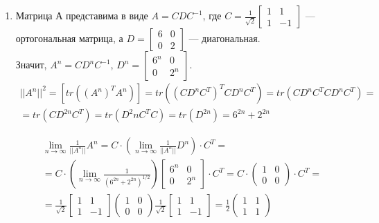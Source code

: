 \documentclass[pdftex,12pt,a4paper]{article}
\begin{document}
\begin{enumerate}
\begin{enumerate}
\item Матрица А представима в виде $A=CDC^{-1}$, где $C=\frac{1}{\sqrt{2}}\left[\begin{array}{cc}
1 & 1\\
1 & -1
\end{array}\right]$ --- ортогональная матрица, а 
 $D=\left[\begin{array}{cc}
6 & 0\\
0 & 2
\end{array}\right]$ --- диагональная.\\ Значит, $A^n=CD^n C^{-1}$, $D^n=\left[\begin{array}{cc}
6^n & 0\\
0 & 2^n
\end{array}\right]$.
\begin{multline}
{||A^n||}^2=[tr((A^n)^T A^n)]=tr((CD^n C^T)^T CD^n C^T)=tr(CD^n C^T CD^n C^T)=\\
=tr(CD^{2n} C^T)=tr(D^2n C^T C)=tr(D^{2n})=6^{2n}+2^{2n}
\end{multline}

\begin{multline}
\lim_{n\to \infty}\frac{1}{||A^n||}A^n=C\cdot\left(\lim_{n\to \infty}\frac{1}{||A^n||}D^n\right)\cdot C^T=\\
= C\cdot\left(\lim_{n\to \infty}\frac{1}{(6^{2n}+2^{2n})^{1/2}}\right)\left[\begin{array}{cc}
6^n & 0\\
0 & 2^n
\end{array}\right]\cdot C^T=C\cdot\left(\begin{array}{cc}
1 & 0\\
0 & 0
\end{array}\right) \cdot C^T =\\
= \frac{1}{\sqrt{2}}\left[\begin{array}{cc}
1 & 1\\
1 & -1
\end{array}\right]\left(\begin{array}{cc}
1 & 0\\
0 & 0
\end{array}\right)\frac{1}{\sqrt{2}}\left[\begin{array}{cc}
1 & 1\\
1 & -1
\end{array}\right]=\frac{1}{2}\left(\begin{array}{cc}
1 & 1\\
1 & 1
\end{array}\right)
\end{multline}


\end{enumerate}
\end{enumerate}
\end{document}
